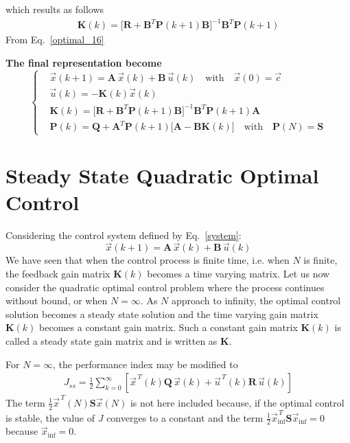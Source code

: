 \documentclass[11pt,a4paper,oneside]{book}
\numberwithin{equation}{section}
\theoremstyle{it}
\theoremstyle{definition}
\begin{document}
which results as follows
\begin{equation}\label{optimal_16}
	\begin{aligned}
		\mathbf{K}(k)=\Big[ 
		\mathbf{R}+\mathbf{B}^T\mathbf{P}(k+1)\mathbf{B}\Big]^{-1}\mathbf{B}^T\mathbf{P}(k+1)
	\end{aligned}
\end{equation}
From Eq.~\eqref{optimal_16}
\begin{mybox}
	\noindent \textbf{The final representation become} 
	\begin{equation}\label{optimal_final}
		\left\lbrace \begin{aligned}
			& \vec{x}(k+1)=\mathbf{A}\,\vec{x}(k)+\mathbf{B}\,\vec{u}(k) \quad 
			\text{with} \quad \vec{x}(0) = \vec{c} \\[6pt]
			& \vec{u}(k) = -\mathbf{K}(k)\vec{x}(k) \\[6pt]
			& \mathbf{K}(k) = \Big[
			\mathbf{R}+\mathbf{B}^T\mathbf{P}(k+1)\mathbf{B}\Big]^{-1}\mathbf{B}^T\mathbf{P}(k+1)
			\mathbf{A} \\[6pt]
			& \mathbf{P}(k) =\mathbf{Q}+\mathbf{A}^T\mathbf{P}(k+1)\Big[ 
			\mathbf{A} -\mathbf{B}\mathbf{K}(k)\Big] \quad \text{with} \quad 
			\mathbf{P}(N) =\mathbf{S}
		\end{aligned}\right. 
	\end{equation}
\end{mybox}

\section{Steady State Quadratic Optimal Control}
Considering the control system defined by Eq.~\eqref{system}:
\begin{equation}\label{optimal_control_ss_eq1}
	\vec{x}(k+1) = \mathbf{A}\,\vec{x}(k)+\mathbf{B}\,\vec{u}(k) 
\end{equation}
We have seen that when the control process is finite time, i.e. when $N$ is 
finite, the feedback gain matrix $\mathbf{K}(k)$ becomes a time varying matrix.
Let us now consider the quadratic optimal control problem where the process 
continues without bound, or when $N=\infty$. As $N$ approach to infinity, the 
optimal control solution becomes a steady state solution and the time varying 
gain matrix $\mathbf{K}(k)$ becomes a constant gain matrix. Such a constant 
gain matrix $\mathbf{K}(k)$ is called a steady state gain matrix and is written 
as $\mathbf{K}$. 

For $N=\infty$, the performance index may be modified to 
\begin{equation}\label{optimal_control_ss_eq2}
	\begin{aligned}
		J_{ss} = \frac{1}{2}\sum_{k=0}^{\infty}\left[ 
		\vec{x}^{\,T}(k)\mathbf{Q}\,\vec{x}(k) + 
		\vec{u}^{\,T}(k)\mathbf{R}\,\vec{u}(k)\right]
	\end{aligned}
\end{equation}
The term $\frac{1}{2}\vec{x}^{\,T}(N)\mathbf{S}\vec{x}(N)$ is not here included 
because, if the optimal control is stable, the value of $J$ converges to a 
constant and the term 
$\frac{1}{2}\vec{x}^{\,T}_{\inf}\mathbf{S}\vec{x}_{\inf}=0$ because 
$\vec{x}_{\inf}=0$.\\
\end{document}
